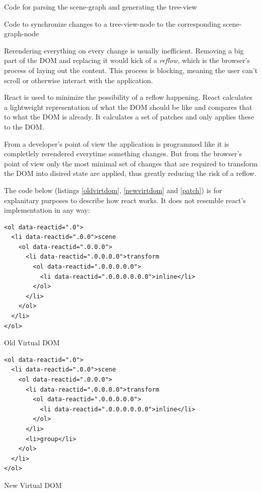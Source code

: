 \begin{enumerate*}
  \item Code for parsing the scene-graph and generating the tree-view
  \item Code to synchronize changes to a tree-view-node to the corresponding scene-graph-node
\end{enumerate*}

Rerendering everything on every change is usually inefficient. Removing a big part
of the DOM and replacing it would kick of a \emph{reflow}, which is the browser's
process of laying out the content. This process is blocking, meaning the user can't
scroll or otherwise interact with the application. \cite{reflow}

React is used to minimize the possibility of a reflow happening. React
calculates a lightweight representation of what the DOM should be like and
compares that to what the DOM is already. It calculates a set of patches and
only applies these to the DOM.

From a developer's point of view the application is programmed like it is
completlely rerendered everytime something changes. But from the browser's point
of view only the most minimal set of changes that are required to transform the
DOM into disired state are applied, thus greatly reducing the risk of a reflow.

The code below (listings \ref{oldvirtdom}, \ref{newvirtdom} and \ref{patch}) is
for explanitary purposes to describe how react works. It does not resemble
react's implementation in any way:

\begin{listing}[H]
  \begin{verbatim}
<ol data-reactid=".0">
  <li data-reactid=".0.0">scene
    <ol data-reactid=".0.0.0">
      <li data-reactid=".0.0.0.0">transform
        <ol data-reactid=".0.0.0.0.0">
          <li data-reactid=".0.0.0.0.0.0">inline</li>
        </ol>
      </li>
    </ol>
  </li>
</ol>
  \end{verbatim}
  \caption{Old Virtual DOM}
  \label{oldvirtdom}
\end{listing}

\begin{listing}[H]
  \begin{verbatim}
<ol data-reactid=".0">
  <li data-reactid=".0.0">scene
    <ol data-reactid=".0.0.0">
      <li data-reactid=".0.0.0.0">transform
        <ol data-reactid=".0.0.0.0.0">
          <li data-reactid=".0.0.0.0.0.0">inline</li>
        </ol>
      </li>
      <li>group</li>
    </ol>
  </li>
</ol>
  \end{verbatim}
  \caption{New Virtual DOM}
  \label{newvirtdom}
\end{listing}

